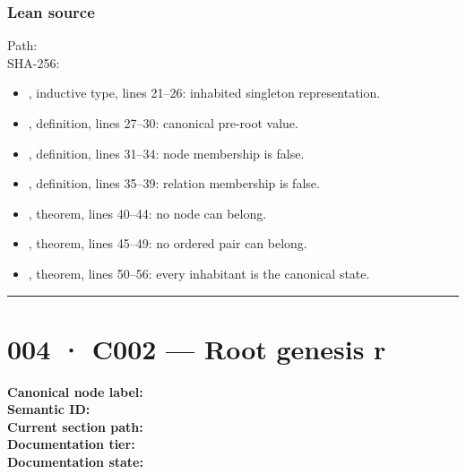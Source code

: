 \subsubsection{Lean source}\label{lean-source-2}

Path:
\texttt{\protect{}}\\
SHA-256:
\texttt{\protect{}}

\begin{itemize}
\tightlist
\item
  \texttt{\protect{}}, inductive type, lines 21--26: inhabited
  singleton representation.
\item
  \texttt{\protect{}}, definition, lines 27--30: canonical pre-root
  value.
\item
  \texttt{\protect{}}, definition, lines 31--34: node membership is
  false.
\item
  \texttt{\protect{}}, definition, lines 35--39: relation
  membership is false.
\item
  \texttt{\protect{}}, theorem, lines 40--44: no node can belong.
\item
  \texttt{\protect{}}, theorem, lines 45--49: no ordered pair can
  belong.
\item
  \texttt{\protect{}}, theorem, lines 50--56: every inhabitant is the
  canonical state.
\end{itemize}

\begin{center}\rule{0.5\linewidth}{0.5pt}\end{center}

\section{004 · C002 --- Root genesis r}\label{c002-root-genesis-r}

\textbf{Canonical node label:} \texttt{\protect{}}\\
\textbf{Semantic ID:} \texttt{\protect{}}\\
\textbf{Current section path:} \texttt{\protect{}}\\
\textbf{Documentation tier:} \texttt{\protect{}}\\
\textbf{Documentation state:} \texttt{\protect{}}

